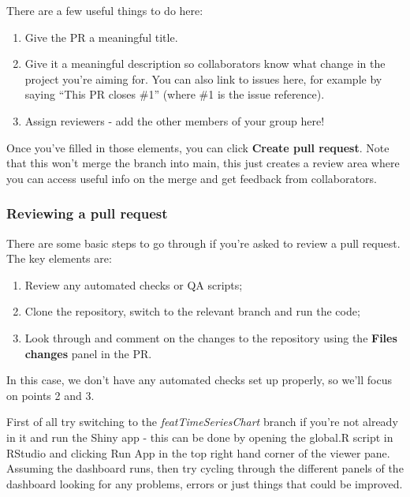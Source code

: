 \documentclass[
  12pt,
]{article}
\providecommand{\tightlist}{%
  \setlength{\itemsep}{0pt}\setlength{\parskip}{0pt}}
\begin{document}
There are a few useful things to do here:

\begin{enumerate}
\def\labelenumi{\arabic{enumi}.}
\tightlist
\item
  Give the PR a meaningful title.
\item
  Give it a meaningful description so collaborators know what change in
  the project you're aiming for. You can also link to issues here, for
  example by saying ``This PR closes \#1'' (where \#1 is the issue
  reference).
\item
  Assign reviewers - add the other members of your group here!
\end{enumerate}

Once you've filled in those elements, you can click \textbf{Create pull
request}. Note that this won't merge the branch into main, this just
creates a review area where you can access useful info on the merge and
get feedback from collaborators.

\hypertarget{reviewing-a-pull-request}{%
\subsubsection{Reviewing a pull
request}\label{reviewing-a-pull-request}}

There are some basic steps to go through if you're asked to review a
pull request. The key elements are:

\begin{enumerate}
\def\labelenumi{\arabic{enumi}.}
\tightlist
\item
  Review any automated checks or QA scripts;
\item
  Clone the repository, switch to the relevant branch and run the code;
\item
  Look through and comment on the changes to the repository using the
  \textbf{Files changes} panel in the PR.
\end{enumerate}

In this case, we don't have any automated checks set up properly, so
we'll focus on points 2 and 3.

First of all try switching to the \emph{featTimeSeriesChart} branch if
you're not already in it and run the Shiny app - this can be done by
opening the global.R script in RStudio and clicking Run App in the top
right hand corner of the viewer pane. Assuming the dashboard runs, then
try cycling through the different panels of the dashboard looking for
any problems, errors or just things that could be improved.
\end{document}
